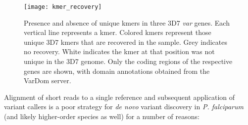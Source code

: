 \begin{landscape}
\begin{figure}
  \centering
    \texttt{[image: kmer\_recovery]}
  \caption{Presence and absence of unique kmers in three 3D7 \textit{var} genes.  Each vertical line represents a kmer.  Colored kmers represent those unique 3D7 kmers that are recovered in the sample.  Grey indicates no recovery.  White indicates the kmer at that position was not unique in the 3D7 genome.  Only the coding regions of the respective genes are shown, with domain annotations obtained from the VarDom server\cite{Rask:2010fia}.}
  \label{fig:kmer_recovery}
\end{figure}
\end{landscape}

Alignment of short reads to a single reference and subsequent application of variant callers is a poor strategy for \textit{de novo} variant discovery in \textit{P. falciparum} (and likely higher-order species as well) for a number of reasons:


